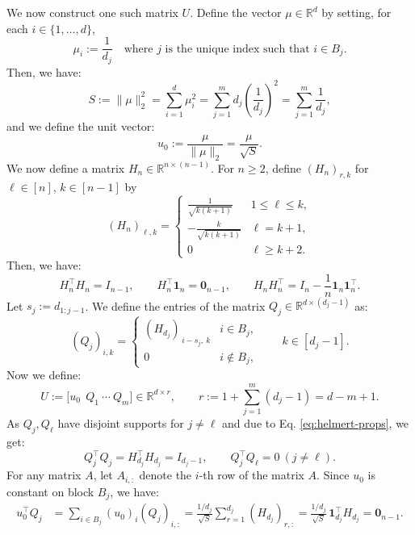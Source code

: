 We now construct one such matrix $U$. Define the vector $\mu\in\mathbb R^d$ by setting, for each $i\in\{1,\ldots,d\}$,
\[
\mu_i := \frac{1}{d_j}\quad \text{where $j$ is the unique index such that } i\in B_j.
\]
Then, we have:
\[
S := \|\mu\|_2^2 = \sum_{i=1}^d \mu_i^2 = \sum_{j=1}^m d_j\left(\frac{1}{d_j}\right)^2
= \sum_{j=1}^m \frac{1}{d_j},
\]
and we define the unit vector:
\[
u_0 := \frac{\mu}{\|\mu\|_2} = \frac{\mu}{\sqrt S}.
\]
We now define a matrix \(H_n\in\mathbb R^{n\times(n-1)}\). For \(n\ge 2\), define \((H_n)_{r,k}\) for \(\ell\in[n]\), \(k\in[n-1]\) by
\begin{equation}\label{eq:helmert-def}
(H_n)_{\ell,k}=
\begin{cases}
\frac{1}{\sqrt{k(k+1)}} & 1\le \ell\le k,\\[4pt]
-\frac{k}{\sqrt{k(k+1)}} & \ell=k+1,\\[4pt]
0 & \ell\ge k+2.\nonumber
\end{cases}
\end{equation}
Then, we have:
\begin{equation}\label{eq:helmert-props}
H_n^\top H_n=I_{n-1},\qquad H_n^\top \mathbf 1_n=\mathbf{0}_{n-1},
\qquad
H_n H_n^\top = I_n-\frac1n\mathbf 1_n\mathbf 1_n^\top.
\end{equation}
Let \(s_j:=d_{1:j-1}\). We define the entries of the matrix \(Q_j\in\mathbb R^{d\times(d_j-1)}\) as:
\begin{equation}\label{eq:Qj-embed}
(Q_j)_{i,k}=
\begin{cases}
(H_{d_j})_{\,i-s_j,\ k} & i\in B_j,\\
0 & i\notin B_j,
\end{cases}
\qquad k\in[d_j-1].
\end{equation}
Now we define:
\begin{equation}\label{eq:U-def}
U:=\big[u_0\ \ Q_1\ \cdots\ Q_m\big]\in\mathbb R^{d\times r},\qquad
r:=1+\sum_{j=1}^m(d_j-1)=d-m+1.\nonumber
\end{equation}
As \(Q_j,Q_\ell\) have disjoint supports  for \(j\neq \ell\) and due to Eq. \eqref{eq:helmert-props}, we get:
\begin{equation}\label{eq:Q-orth}
Q_j^\top Q_j = H_{d_j}^\top H_{d_j}=I_{d_j-1},\qquad
Q_j^\top Q_\ell=0\ (j\neq \ell).\nonumber
\end{equation}
For any matrix $A$, let $A_{i,:}$ denote the $i$-th row of the matrix $A$. Since \(u_0\) is constant on block \(B_j\), we have:
\begin{align*}\label{eq:u0-Qj-orth}
u_0^\top Q_j
&=\sum_{i\in B_j}(u_0)_i (Q_j)_{i,:}
=\frac{1/d_j}{\sqrt S}\sum_{r=1}^{d_j}(H_{d_j})_{r,:}
=\frac{1/d_j}{\sqrt S}\,\mathbf 1_{d_j}^\top H_{d_j}
=\mathbf{0}_{n-1}.
\end{align*}
